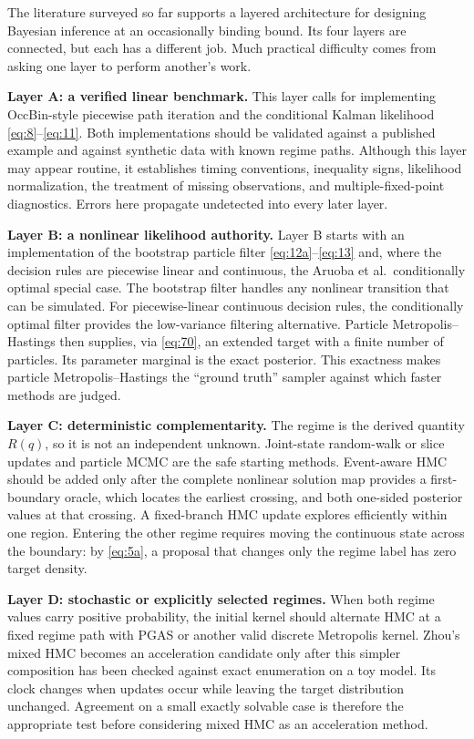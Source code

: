 \documentclass[11pt]{article}
\begin{document}
The literature surveyed so far supports a layered architecture for designing Bayesian inference at an occasionally binding bound. Its four layers are connected, but each has a different job. Much practical difficulty comes from asking one layer to perform another's work.

\textbf{Layer A: a verified linear benchmark.} This layer calls for implementing OccBin-style piecewise path iteration and the conditional Kalman likelihood \eqref{eq:8}--\eqref{eq:11}. Both implementations should be validated against a published example and against synthetic data with known regime paths. Although this layer may appear routine, it establishes timing conventions, inequality signs, likelihood normalization, the treatment of missing observations, and multiple-fixed-point diagnostics. Errors here propagate undetected into every later layer.

\textbf{Layer B: a nonlinear likelihood authority.} Layer B starts with an implementation of the bootstrap
particle filter \eqref{eq:12a}--\eqref{eq:13} and, where the decision rules are
piecewise linear and continuous, the Aruoba et al.\ conditionally optimal
special case. The bootstrap filter handles any nonlinear transition that can
be simulated. For piecewise-linear continuous decision rules, the
conditionally optimal filter provides the low-variance filtering alternative.
Particle Metropolis--Hastings then supplies, via
\eqref{eq:70}, an extended target with a finite number of particles.
Its parameter marginal is the exact posterior. This exactness makes particle
Metropolis--Hastings the ``ground truth'' sampler against which faster methods
are judged.

\textbf{Layer C: deterministic complementarity.} The regime is the derived
quantity $R(q)$, so it is not an independent unknown. Joint-state
random-walk or slice updates and particle MCMC are the safe starting methods.
Event-aware HMC should be added only after the complete nonlinear solution map
provides a first-boundary oracle, which locates the earliest crossing, and
both one-sided posterior values at that crossing. A fixed-branch HMC update
explores efficiently within one region. Entering the other regime requires
moving the continuous state across the boundary: by
\eqref{eq:5a}, a proposal that changes only the regime label has zero target
density.

\textbf{Layer D: stochastic or explicitly selected regimes.} When both regime
values carry positive probability, the initial kernel should alternate HMC at
a fixed regime path with PGAS or another valid discrete Metropolis kernel.
Zhou's mixed HMC becomes an acceleration candidate only after this simpler
composition has been checked against exact enumeration on a toy model. Its
clock changes when updates occur while leaving the target distribution
unchanged. Agreement on a small exactly solvable case is therefore the
appropriate test before considering mixed HMC as an acceleration method.
\end{document}
